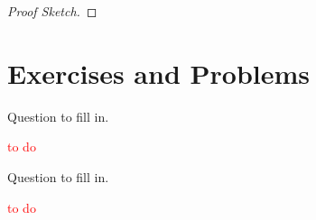 \begin{proof}[Proof Sketch]

\end{proof}

\section*{Exercises and Problems}

\setcounter{exercise}{16}

\begin{exercise}
  Question to fill in.
\end{exercise}

\textcolor{red}{to do}

\setcounter{exercise}{18}

\begin{exercise}
  Question to fill in.
\end{exercise}

\textcolor{red}{to do}
